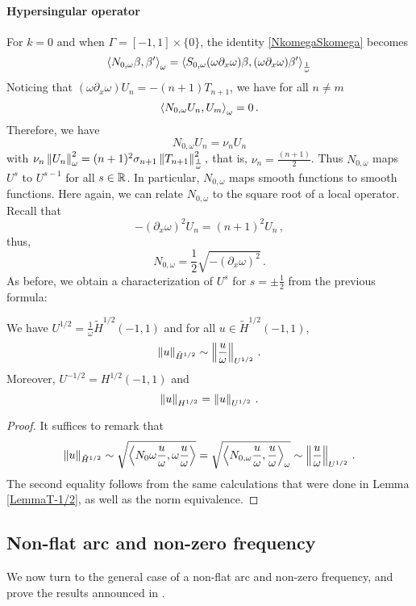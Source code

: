 \documentclass[a4paper]{article}
\begin{document}
\paragraph{Hypersingular operator}For $k = 0$ and when $\Gamma = [-1,1]\times \{0\}$, the identity \eqref{NkomegaSkomega} becomes
\[\left\langle N_{0,\omega} \beta,\beta'\right\rangle_\omega = \left\langle S_{0,\omega}  (\omega \partial_x \omega) \beta, (\omega \partial_x \omega) \beta'\right\rangle_\frac{1}{\omega}\] 
Noticing that $(\omega \partial_x \omega) U_n = -(n+1) T_{n+1}$, we have for all $n \neq m$ 
\[\left\langle N_{0,\omega }U_n,U_m\right\rangle_\omega = 0 \,.\]
Therefore, we have 
\[N_{0,\omega} U_n = \nu_n U_n\] 
with 
$\nu_n\left\|U_n\right\|_{\omega}^2 = (n+1)^2 \sigma_{n+1} \left\|T_{n+1}\right\|_\frac{1}{\omega}^2,$
that is, $\nu_n = \frac{(n+1)}{2}$.
Thus $N_{0,\omega}$ maps $U^s$ to $U^{s-1}$ for all $s \in \mathbb{R}$. In particular, $N_{0,\omega}$ maps smooth functions to smooth functions. 
Here again, we can relate $N_{0,\omega}$ to the square root of a local operator. Recall that
\[-(\partial_x \omega)^2 U_n = (n+1)^2 U_n\,,\]
thus,
\begin{equation}
\label{prelude2}
	N_{0,\omega} = \frac{1}{2}\sqrt{-(\partial_x \omega)^2}\,.
\end{equation}
As before, we obtain a characterization of $U^{s}$ for $s = \pm \frac{1}{2}$ from the previous formula:
\begin{Lem} 
\label{LemU12}	
We have $U^{1/2} =  \frac{1}{\omega} \tilde{H}^{1/2}(-1,1)$ and for all $u\in \tilde{H}^{1/2}(-1,1)$,
\[\left\|u\right\|_{\tilde{H}^{1/2}} \sim \left\|\frac{u}{\omega}\right\|_{U^{1/2}}\,.\]
Moreover, $U^{-1/2} = H^{1/2}(-1,1)$ and 
\[\left\|u\right\|_{H^{1/2}} = \left\|u\right\|_{U^{1/2}}\,.\]
\end{Lem}
\begin{proof} It suffices to remark that 
	\[ \left\|u\right\|_{\tilde{H}^{1/2}} \sim \sqrt{\left\langle N_0\omega \frac{u}{\omega},\omega \frac{u}{\omega}\right\rangle} = \sqrt{\left\langle N_{0,\omega} \frac{u}{\omega},\frac{u}{\omega}\right\rangle_\omega} \sim \left\|\frac{u}{\omega}\right\|_{U^{1/2}}\,.\]
	The second equality follows from the same calculations that were done in Lemma \ref{LemmaT-1/2}, as well as the norm equivalence. 
\end{proof}

\subsection{Non-flat arc and non-zero frequency}

We now turn to the general case of a non-flat arc and non-zero frequency, and prove the results announced in \cite{alouges2018new}.
\end{document}
